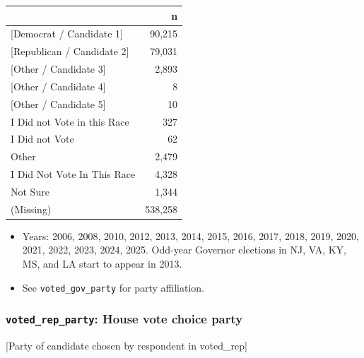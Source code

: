\documentclass[10pt,article,oneside]{memoir}
\begin{document}
\begin{table}[H]
\centering
\begin{tabular}[t]{lr}
\toprule
 & n\\
\midrule
{}{[Democrat / Candidate 1]} & 90,215\\
{}{[Republican / Candidate 2]} & 79,031\\
{}{[Other / Candidate 3]} & 2,893\\
{}{[Other / Candidate 4]} & 8\\
{}{[Other / Candidate 5]} & 10\\
I Did not Vote in this Race & 327\\
I Did not Vote & 62\\
Other & 2,479\\
I Did Not Vote In This Race & 4,328\\
Not Sure & 1,344\\
(Missing) & 538,258\\
\bottomrule
\end{tabular}
\end{table}

\begin{itemize}
\tightlist
\item
  Years: 2006, 2008, 2010, 2012, 2013, 2014, 2015, 2016, 2017, 2018,
  2019, 2020, 2021, 2022, 2023, 2024, 2025. Odd-year Governor elections
  in NJ, VA, KY, MS, and LA start to appear in 2013.
\item
  See \texttt{voted\_gov\_party} for party affiliation.
\end{itemize}

\subsubsection{\texorpdfstring{\texttt{voted\_rep\_party}: House vote
choice
party}{voted\_rep\_party: House vote choice party}}\label{voted_rep_party-house-vote-choice-party}

{[}Party of candidate chosen by respondent in voted\_rep{]}
\end{document}
